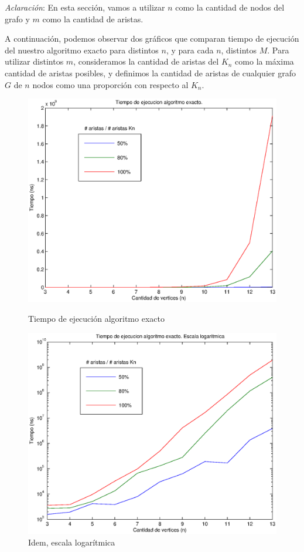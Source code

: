 \emph{Aclaración}: En esta sección, vamos a utilizar $n$ como la cantidad de nodos del grafo y $m$ como la cantidad de aristas.

A continuación, podemos observar dos gráficos que comparan tiempo de ejecución del nuestro algoritmo exacto para distintos $n$, y para cada $n$, distintos $M$. Para utilizar distintos $m$, consideramos la cantidad de aristas del $K_n$ como la máxima cantidad de aristas posibles, y definimos la cantidad de aristas de cualquier grafo $G$ de $n$ nodos como una proporción con respecto al $K_n$.

\begin{figure}[H]
  \begin{minipage}{0.5\linewidth}
    \includegraphics[width=\linewidth]{graficos/exacto_tiempo.eps}
    \caption{Tiempo de ejecución algoritmo exacto}\label{fig:exacto-tiempo}
  \end{minipage}
  \hfill
  \begin{minipage}{0.5\linewidth}
    \includegraphics[width=\linewidth]{graficos/exacto_tiempo_log.eps}
    \caption{Idem, escala logarítmica}\label{fig:exacto-tiempo-log}
  \end{minipage}
\end{figure}

